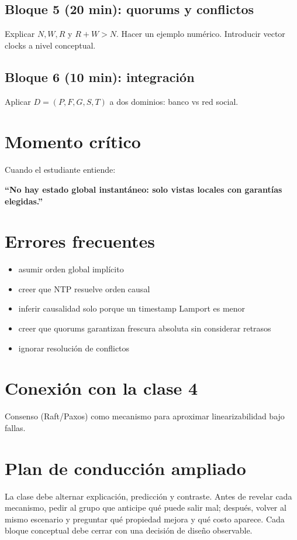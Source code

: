 \documentclass[variant=docente,cover=institutional,mode=screen]{ua-engineering-v6-article}
\begin{document}
\subsection*{Bloque 5 (20 min): quorums y conflictos}
Explicar $N,W,R$ y $R+W>N$. Hacer un ejemplo numérico. Introducir vector clocks a nivel conceptual.

\subsection*{Bloque 6 (10 min): integración}
Aplicar $D=(P,F,G,S,T)$ a dos dominios: banco vs red social.

\section{Momento crítico}

Cuando el estudiante entiende:
\begin{center}
\textbf{“No hay estado global instantáneo: solo vistas locales con garantías elegidas.”}
\end{center}

\section{Errores frecuentes}

\begin{itemize}
\item asumir orden global implícito
\item creer que NTP resuelve orden causal
\item inferir causalidad solo porque un timestamp Lamport es menor
\item creer que quorums garantizan frescura absoluta sin considerar retrasos
\item ignorar resolución de conflictos
\end{itemize}

\section{Conexión con la clase 4}

Consenso (Raft/Paxos) como mecanismo para aproximar linearizabilidad bajo fallas.


\section{Plan de conducción ampliado}
La clase debe alternar explicación, predicción y contraste. Antes de revelar cada mecanismo, pedir al grupo que anticipe qué puede salir mal; después, volver al mismo escenario y preguntar qué propiedad mejora y qué costo aparece. Cada bloque conceptual debe cerrar con una decisión de diseño observable.
\end{document}
